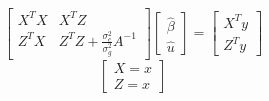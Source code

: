 \documentclass{article}
\begin{document}
\begin{equation}
  \begin{bmatrix}
    X^TX & X^TZ \\
    Z^TX & Z^TZ+\frac{\sigma^{2}_{e}}{\sigma^{2}_{g}} A^{-1}
  \end{bmatrix}
  \begin{bmatrix}
    \hat{\beta} \\
    \hat{u}
  \end{bmatrix}
  =
  \begin{bmatrix}
    X^Ty \\
    Z^Ty
  \end{bmatrix}
\end{equation}
\begin{equation}
    \begin{bmatrix}
        X = x\\
        Z = x
    \end{bmatrix}
\end{equation}
\end{document}
